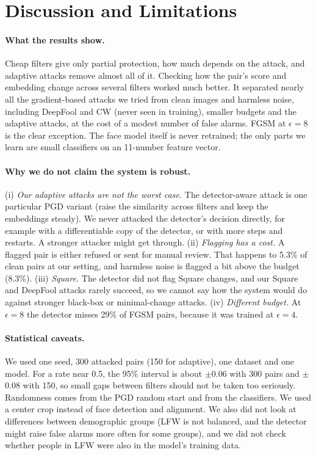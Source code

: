 \section{Discussion and Limitations}
\label{sec:discussion}
\paragraph{What the results show.} Cheap filters give only partial protection, how much depends on the attack, and adaptive attacks remove almost all of it. Checking how the pair's score and embedding change across several filters worked much better. It separated nearly all the gradient-based attacks we tried from clean images and harmless noise, including DeepFool and CW (never seen in training), smaller budgets and the adaptive attacks, at the cost of a modest number of false alarms. FGSM at $\epsilon{=}8$ is the clear exception. The face model itself is never retrained; the only parts we learn are small classifiers on an 11-number feature vector.

\paragraph{Why we do not claim the system is robust.} (i) \emph{Our adaptive attacks are not the worst case.} The detector-aware attack is one particular PGD variant (raise the similarity across filters and keep the embeddings steady). We never attacked the detector's decision directly, for example with a differentiable copy of the detector, or with more steps and restarts. A stronger attacker might get through. (ii) \emph{Flagging has a cost.} A flagged pair is either refused or sent for manual review. That happens to 5.3\% of clean pairs at our setting, and harmless noise is flagged a bit above the budget (8.3\%). (iii) \emph{Square.} The detector did not flag Square changes, and our Square and DeepFool attacks rarely succeed, so we cannot say how the system would do against stronger black-box or minimal-change attacks. (iv) \emph{Different budget.} At $\epsilon{=}8$ the detector misses 29\% of FGSM pairs, because it was trained at $\epsilon{=}4$.

\paragraph{Statistical caveats.} We used one seed, 300 attacked pairs (150 for adaptive), one dataset and one model. For a rate near 0.5, the 95\% interval is about $\pm$0.06 with 300 pairs and $\pm$0.08 with 150, so small gaps between filters should not be taken too seriously. Randomness comes from the PGD random start and from the classifiers. We used a center crop instead of face detection and alignment. We also did not look at differences between demographic groups (LFW is not balanced, and the detector might raise false alarms more often for some groups), and we did not check whether people in LFW were also in the model's training data.

